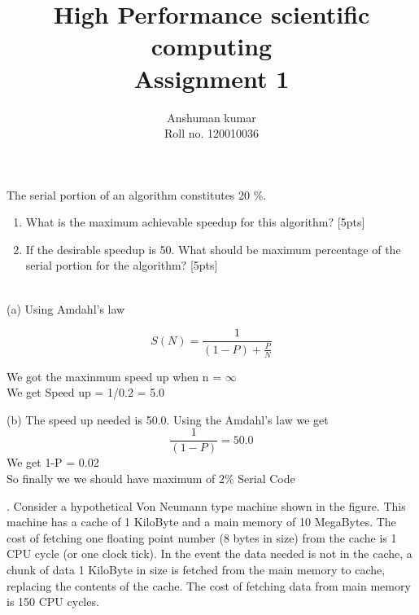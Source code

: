 \documentclass[12pt]{exam}
\title {High Performance scientific computing \\
Assignment 1}
\author {Anshuman kumar \\
Roll no.  120010036}
\begin{document}
\maketitle


\begin{questions}
    \question The serial portion of an algorithm constitutes 20 \%.
    \begin{enumerate}[label=(\alph*)]
        \item What is the maximum achievable speedup for this algorithm? [5pts]
        \item If the desirable speedup is 50. What should be maximum 
            percentage of the serial portion for the algorithm? [5pts]
    \end{enumerate}
    \begin{solution} \\
        (a) Using Amdahl's law

        \[
            S(N) = \frac{1}{(1-P) + \frac{P}{N}}
        \]

        We got the maxinmum speed up when n = \(\infty\) \\ 
        We get Speed up = 1/0.2 = 5.0

        (b) The speed up needed is 50.0. Using the Amdahl's law we get 
        \[
            \frac{1}{(1-P)} = 50.0
        \]
        We get 1-P = 0.02  \\
        So finally we we should have maximum of 2\% Serial Code
    \end{solution}

    \question . Consider a hypothetical Von Neumann type machine shown in the
    figure. This machine has a cache of 1 KiloByte and a main memory of 10
    MegaBytes. The cost of fetching one floating point number (8 bytes in size)
    from the cache is 1 CPU cycle (or one clock tick). In the event the data
    needed is not in the cache, a chunk of data 1 KiloByte in size is fetched
    from the main memory to cache, replacing the contents of the cache.
    The cost of fetching data from main memory is 150 CPU cycles.


\end{questions}
\end{document}
